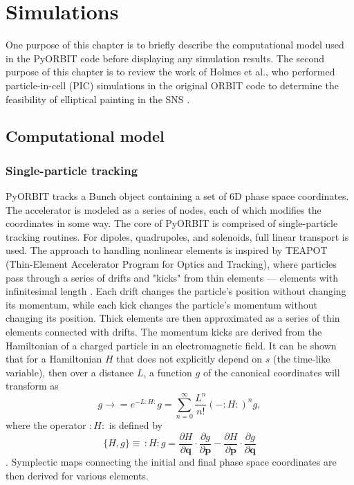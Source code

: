 \chapter{Simulations} \label{chap-3}

One purpose of this chapter is to briefly describe the computational model used in the PyORBIT code before displaying any simulation results. The second purpose of this chapter is to review the work of Holmes et al., who performed particle-in-cell (PIC) simulations in the original ORBIT code to determine the feasibility of elliptical painting in the SNS \cite{Holmes2018}. 



\section{Computational model}

\subsection{Single-particle tracking}

PyORBIT tracks a Bunch object containing a set of 6D phase space coordinates. The accelerator is modeled as a series of nodes, each of which modifies the coordinates in some way. The core of PyORBIT is comprised of single-particle tracking routines. For dipoles, quadrupoles, and solenoids, full linear transport is used. The approach to handling nonlinear elements is inspired by TEAPOT (Thin-Element Accelerator Program for Optics and Tracking), where particles pass through a series of drifts and "kicks" from thin elements — elements with infinitesimal length \cite{Schachinger1987}. Each drift changes the particle's position without changing its momentum, while each kick changes the particle's momentum without changing its position. Thick elements are then approximated as a series of thin elements connected with drifts. The momentum kicks are derived from the Hamiltonian of a charged particle in an electromagnetic field. It can be shown that for a Hamiltonian $H$ that does not explicitly depend on $s$ (the time-like variable), then over a distance $L$, a function $g$ of the canonical coordinates will transform as
%
\begin{equation}
    g \rightarrow 
    = e^{-L:H:} g
    = \sum_{n=0}^{\infty}{\frac{L^n}{n!} (-:H:)^n g},
\end{equation}
%
where the operator $:H:$ is defined by
%
\begin{equation}
    \{H, g\} \equiv \, :H: g =
    \frac{\partial{H}}{\partial{\mathbf{q}}}
    \cdot
    \frac{\partial{g}}{\partial{\mathbf{p}}}
    -
    \frac{\partial{H}}{\partial{\mathbf{p}}}
    \cdot
    \frac{\partial{g}}{\partial{\mathbf{q}}}
\end{equation}
%
\cite{Dragt2018, Forest1998}. Symplectic maps connecting the initial and final phase space coordinates are then derived for various elements.

